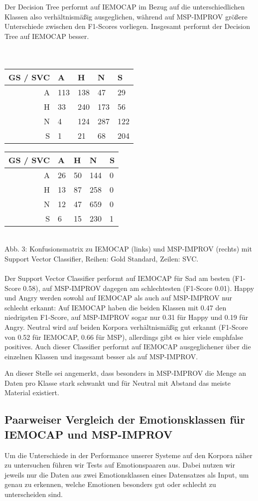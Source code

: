 \documentclass{article} %
\begin{document}
Der Decision Tree performt auf IEMOCAP im Bezug auf die unterschiedlichen Klassen also verhältnismäßig ausgeglichen, während auf MSP-IMPROV größere Unterschiede zwischen den F1-Scores vorliegen. Insgesamt performt der Decision Tree auf IEMOCAP besser. \\ \\ \\
\begin{tabular}{|r|llll|}
\hline
GS / SVC & A & H & N & S \\
\hline
A & 113 & 138 & 47 & 29 \\
H & 33 & 240 & 173 & 56 \\
N & 4 & 124 & 287 & 122 \\
S & 1 & 21 & 68 & 204 \\
\hline
\end{tabular} 
\begin{tabular}{|r|llll|}
\hline
GS / SVC & A & H & N & S \\
\hline
A & 26 & 50 & 144 & 0 \\
H & 13 & 87 & 258 & 0 \\
N & 12 & 47 & 659 & 0 \\
S & 6 & 15 & 230 & 1 \\
\hline
\end{tabular} \\
Abb. 3: Konfusionsmatrix zu IEMOCAP (links) und MSP-IMPROV (rechts) mit Support Vector Classifier, Reihen: Gold Standard, Zeilen: SVC. \\ \\
Der Support Vector Classifier performt auf IEMOCAP für Sad am besten (F1-Score 0.58), auf MSP-IMPROV dagegen am schlechtesten (F1-Score 0.01). Happy und Angry werden sowohl auf IEMOCAP als auch auf MSP-IMPROV nur schlecht erkannt: Auf IEMOCAP haben die beiden Klassen mit 0.47 den niedrigsten F1-Score, auf MSP-IMPROV sogar nur 0.31 für Happy und 0.19 für Angry. 
Neutral wird auf beiden Korpora verhältnismäßig gut erkannt (F1-Score von 0.52 für IEMOCAP, 0.66 für MSP), allerdings gibt es hier viele emph{false positives}. Auch dieser Classifier performt auf IEMOCAP ausgeglichener über die einzelnen Klassen und insgesamt besser als auf MSP-IMPROV. 

An dieser Stelle sei angemerkt, dass besonders in MSP-IMPROV die Menge an Daten pro Klasse stark schwankt und für Neutral mit Abstand das meiste Material existiert. 
\subsection{Paarweiser Vergleich der Emotionsklassen für IEMOCAP und MSP-IMPROV}
Um die Unterschiede in der Performance unserer Systeme auf den Korpora näher zu untersuchen führen wir Tests auf Emotionspaaren aus. Dabei nutzen wir jeweils nur die Daten aus zwei Emotionsklassen eines Datensatzes als Input, um genau zu erkennen, welche Emotionen besonders gut oder schlecht zu unterscheiden sind. 
\end{document}
